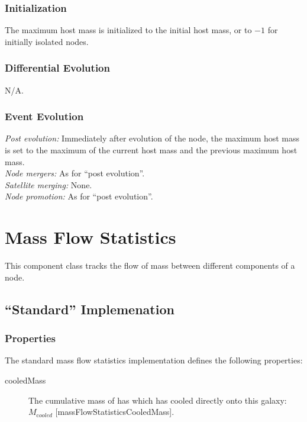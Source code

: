 \subsubsection{Initialization}

The maximum host mass is initialized to the initial host mass, or to $-1$ for initially isolated nodes.

\subsubsection{Differential Evolution}

N/A.

\subsubsection{Event Evolution}

\noindent\emph{Post evolution:} Immediately after evolution of the node, the maximum host mass is set to the maximum of the current host mass and the previous maximum host mass.\\

\noindent\emph{Node mergers:} As for ``post evolution''.\\

\noindent\emph{Satellite merging:} None.\\

\noindent\emph{Node promotion:} As for ``post evolution''.\\

\section{Mass Flow Statistics}

This component class tracks the flow of mass between different components of a \gls{node}.

\subsection{``Standard'' Implemenation}

\subsubsection{Properties}

The standard mass flow statistics implementation defines the following properties:
\begin{description}
 \item [{\normalfont \ttfamily cooledMass}] The cumulative mass of has which has cooled directly onto this galaxy: $M_{\mathrm cooled}$ [{\normalfont \ttfamily massFlowStatisticsCooledMass}].
\end{description}

